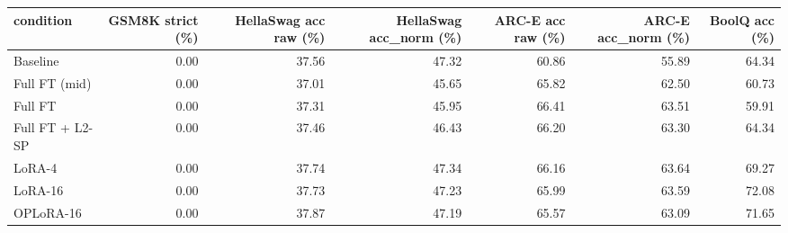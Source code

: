 \begin{tabular}{lrrrrrr}
\toprule
condition & GSM8K strict (\%) & HellaSwag acc raw (\%) & HellaSwag acc\_norm (\%) & ARC-E acc raw (\%) & ARC-E acc\_norm (\%) & BoolQ acc (\%) \\
\midrule
Baseline & 0.00 & 37.56 & 47.32 & 60.86 & 55.89 & 64.34 \\
Full FT (mid) & 0.00 & 37.01 & 45.65 & 65.82 & 62.50 & 60.73 \\
Full FT & 0.00 & 37.31 & 45.95 & 66.41 & 63.51 & 59.91 \\
Full FT + L2-SP & 0.00 & 37.46 & 46.43 & 66.20 & 63.30 & 64.34 \\
LoRA-4 & 0.00 & 37.74 & 47.34 & 66.16 & 63.64 & 69.27 \\
LoRA-16 & 0.00 & 37.73 & 47.23 & 65.99 & 63.59 & 72.08 \\
OPLoRA-16 & 0.00 & 37.87 & 47.19 & 65.57 & 63.09 & 71.65 \\
\bottomrule
\end{tabular}
